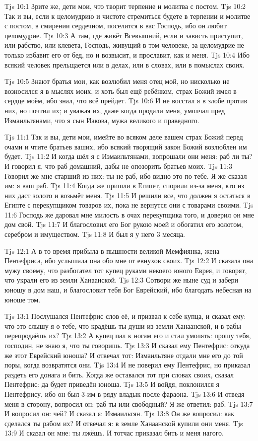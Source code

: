 \vs Tjs 10:1
Зрите же, дети мои, что творит терпение и молитва с постом.
\vs Tjs 10:2
Так и вы, если к целомудрию и чистоте стремиться будете
в терпении и молитве с постом,
в смирении сердечном, поселится в вас Господь,
ибо он любит целомудрие.
\vs Tjs 10:3
А там, где живёт Всевышний, если и зависть приступит,
или рабство, или клевета, Господь, живущий в том человеке,
за целомудрие не только избавит его от бед,
но и возвысит, и прославит, как и меня.
\vs Tjs 10:4
Ибо всякий человек прельщается или в делах, или в словах,
или в помыслах своих.

\vs Tjs 10:5
Знают братья мои, как возлюбил меня отец мой,
но нисколько не возносился я в мыслях моих,
и хоть был ещё ребёнком, страх Божий имел
в сердце моём, ибо знал, что всё прейдет.
\vs Tjs 10:6
И не восстал я в злобе против них,
но почтил их; и уважая их,
даже когда продали меня, умолчал пред Измаильтянами,
что я сын Иакова, мужа великого и праведного.

\vs Tjs 11:1
Так и вы, дети мои, имейте во всяком деле вашем
страх Божий перед очами и чтите братьев ваших,
ибо всякий творящий закон Божий возлюблен им будет.
\vs Tjs 11:2
И когда шёл я с Измаильтянами,
вопрошали они меня: раб ли ты?
И говорил я, что раб домашний,
дабы не опозорить братьев моих.
\vs Tjs 11:3
Говорил же мне старший из них:
ты не раб, ибо видно это по тебе.
Я же сказал им: я ваш раб.
\vs Tjs 11:4
Когда же пришли в Египет, спорили из-за меня,
кто из них даст золото и возьмёт меня.
\vs Tjs 11:5
И решили все, что должен я остаться в Египте
с перекупщиком товаров их, пока не вернутся они с товарами своими.
\vs Tjs 11:6
Господь же даровал мне милость в очах перекупщика того,
и доверил он мне дом свой.
\vs Tjs 11:7
И благословил его Бог рукою моей и обогатил его
золотом, серебром и имуществом.
\vs Tjs 11:8
И был я у него 3 месяца.

\vs Tjs 12:1
А в то время прибыла в пышности великой Мемфиянка,
жена Пентефриса, ибо услышала она обо мне от евнухов своих.
\vs Tjs 12:2
И сказала она мужу своему, что разбогател тот купец
руками некоего юного Еврея, и говорят, что украли его
из земли Ханаанской.
\vs Tjs 12:3
Сотвори же ныне суд и забери юношу в дом наш,
и благословит тебя Бог Еврейский,
ибо благодать небесная на юноше том.

\vs Tjs 13:1
Послушался Пентефрис слов её, и призвал к себе купца,
и сказал ему: что это слышу я о тебе, что крадёшь
ты души из земли Ханаанской,
и в рабы перепродаёшь их?
\vs Tjs 13:2
А купец пал к ногам его и стал умолять:
прошу тебя, господин, не знаю я, что ты говоришь.
\vs Tjs 13:3
И сказал ему Пентефрис: откуда же этот Еврейский юноша?
И отвечал тот: Измаильтяне отдали мне его до той поры,
когда возвратятся они.
\vs Tjs 13:4
И не поверил ему Пентефрис, но приказал раздеть его донага и бить.
Когда же оставался тот при словах своих, сказал Пентефрис:
да будет приведён юноша.
\vs Tjs 13:5
И войдя, поклонился я Пентефрису,
ибо он был 3-им в ряду владык после фараона.
\vs Tjs 13:6
И отведя меня в сторону, вопросил он:
раб ты или свободный?
Я же ответил: раб.
\vs Tjs 13:7
И вопросил он: чей?
И сказал я: Измаильтян.
\vs Tjs 13:8
Он же вопросил: как сделался ты рабом их?
И отвечал я: в земле Ханаанской купили они меня.
\vs Tjs 13:9
И сказал он мне: ты лжёшь.
И тотчас приказал бить и меня нагого.

